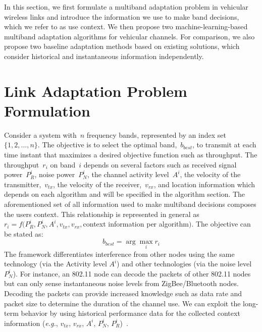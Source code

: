 

In this section, we first formulate a multiband 
adaptation problem in vehicular wireless links and introduce the 
information we use to make band decisions, which we refer to as use context. We then propose two machine-learning-based 
multiband adaptation algorithms for vehicular channels. For comparison, we also propose two baseline adaptation methods based on existing solutions, which consider historical and instantaneous information independently.




\section{Link Adaptation Problem Formulation}

Consider a system with~$n$ frequency bands, represented by an index set~$\{1,2, \ldots, n\}$. 
The objective is to select the optimal band,~$b_{best}$, to transmit at each time instant that maximizes a desired objective function such as throughput. The throughput~$r_i$ on band~$i$ depends on several factors such as received signal power~$P_R^i$, noise power~$P_N^i$, the channel activity level~$A^i$, the velocity of the transmitter,~$v_{tx}$,
 the velocity of the receiver,~$v_{rx}$, 
 and location information which depends on each algorithm and will be specified in the algorithm section. The aforementioned set of all information used to make multiband decisions composes the users context. 
This relationship is represented in general as~$r_i = f(P_R^i, P_N^i, A^i, v_{tx}, v_{rx}, $context information per algorithm$)$. The objective can be stated as:
\begin{equation}
b_{best}= \arg \max_i r_i 
\end{equation}
The framework differentiates interference from other nodes using the same technology (via the Activity level $A^i$) and other technologies (via the noise level~$P_N^i$). For instance, an 802.11 node can decode the packets of other 802.11 nodes but can only sense
instantaneous noise levels from ZigBee/Bluetooth nodes. 
Decoding the packets can provide increased knowledge such as 
data rate and packet size to determine the duration of the channel use.
We can exploit the long-term behavior by using historical performance
data for the collected context information
({\it e.g.}, $v_{tx}$, $v_{rx}$, $A^i$, $P_N^i$, $P_R^i$)~\cite{meikle2012global}. 


